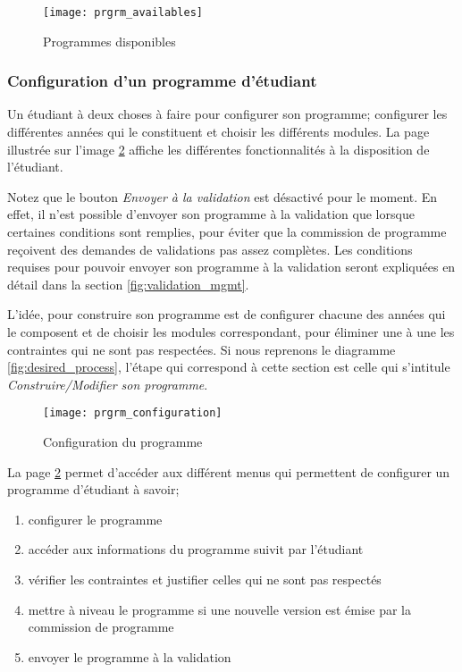 \begin{figure}
\centering
\caption{Programmes disponibles}
\label{fig:prgrm_availables}
\texttt{[image: prgrm\_availables]}
\end{figure}

\subsubsection{Configuration d'un programme d'étudiant}
\label{prgrm_mgmt}
Un étudiant à deux choses à faire pour configurer son programme; configurer les différentes années qui le constituent et choisir les différents modules. La page illustrée sur l'image \ref{fig:program_configure} affiche les différentes fonctionnalités à la disposition de l'étudiant. 

Notez que le bouton \textit{Envoyer à la validation} est désactivé pour le moment. En effet, il n'est possible d'envoyer son programme à la validation que lorsque certaines conditions sont remplies, pour éviter que la commission de programme reçoivent des demandes de validations pas assez complètes. Les conditions requises pour pouvoir envoyer son programme à la validation seront expliquées en détail dans la section \ref{fig:validation_mgmt}. 

 
L'idée, pour construire son programme est de configurer chacune des années qui le composent et de choisir les modules correspondant, pour éliminer une à une les contraintes qui ne sont pas respectées. Si nous reprenons le diagramme \ref{fig:desired_process}, l'étape qui correspond à cette section est celle qui s'intitule \textit{Construire/Modifier son programme}.



\begin{figure}
\centering
\caption{Configuration du programme}
\label{fig:program_configure}
\texttt{[image: prgrm\_configuration]}
\end{figure}

La page \ref{fig:program_configure} permet d'accéder aux différent menus qui permettent de configurer un programme d'étudiant à savoir;
\begin{enumerate}
\item configurer le programme
\item accéder aux informations du programme suivit par l'étudiant
\item vérifier les contraintes et justifier celles qui ne sont pas respectés
\item mettre à niveau le programme si une nouvelle version est émise par la commission de programme
\item envoyer le programme à la validation
\end{enumerate}

